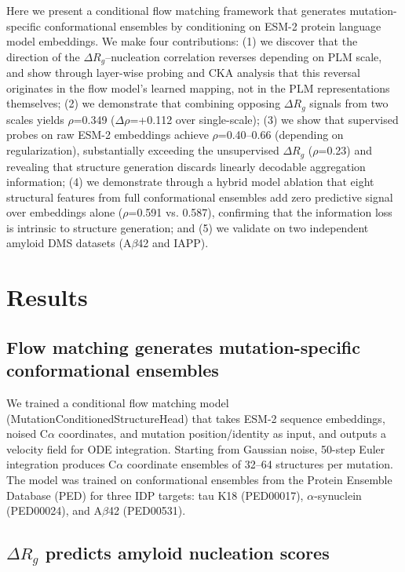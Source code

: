 \documentclass[10pt,letterpaper]{article}
\begin{document}
Here we present a conditional flow matching framework that generates mutation-specific conformational ensembles by conditioning on ESM-2 protein language model embeddings. We make four contributions: (1) we discover that the direction of the $\Delta R_g$--nucleation correlation reverses depending on PLM scale, and show through layer-wise probing and CKA analysis that this reversal originates in the flow model's learned mapping, not in the PLM representations themselves; (2) we demonstrate that combining opposing $\Delta R_g$ signals from two scales yields $\rho$=0.349 ($\Delta\rho$=+0.112 over single-scale); (3) we show that supervised probes on raw ESM-2 embeddings achieve $\rho$=0.40--0.66 (depending on regularization), substantially exceeding the unsupervised $\Delta R_g$ ($\rho$=0.23) and revealing that structure generation discards linearly decodable aggregation information; (4) we demonstrate through a hybrid model ablation that eight structural features from full conformational ensembles add zero predictive signal over embeddings alone ($\rho$=0.591 vs. 0.587), confirming that the information loss is intrinsic to structure generation; and (5) we validate on two independent amyloid DMS datasets (A$\beta$42 and IAPP).

\section*{Results}

\subsection*{Flow matching generates mutation-specific conformational ensembles}

We trained a conditional flow matching model (MutationConditionedStructureHead) that takes ESM-2 sequence embeddings, noised C$\alpha$ coordinates, and mutation position/identity as input, and outputs a velocity field for ODE integration. Starting from Gaussian noise, 50-step Euler integration produces C$\alpha$ coordinate ensembles of 32--64 structures per mutation. The model was trained on conformational ensembles from the Protein Ensemble Database (PED) for three IDP targets: tau K18 (PED00017), $\alpha$-synuclein (PED00024), and A$\beta$42 (PED00531).

\subsection*{$\Delta R_g$ predicts amyloid nucleation scores}
\end{document}
